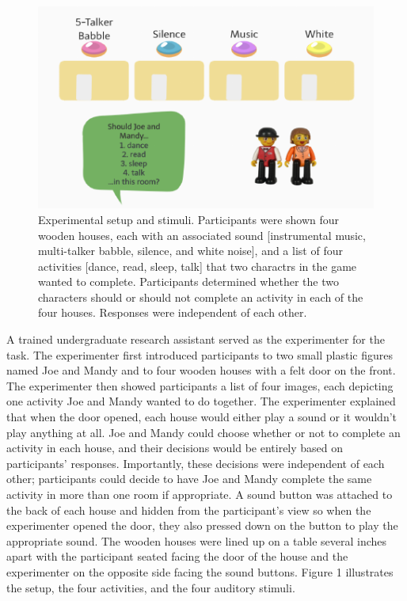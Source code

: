 \documentclass[10pt, letterpaper]{article}
\newenvironment{CodeChunk}{}{}
\begin{document}
\begin{CodeChunk}
\begin{figure}[t]

{\centering \includegraphics{figs/e3-stimuli-1} 

}

\caption[Experimental setup and stimuli]{Experimental setup and stimuli. Participants were shown four wooden houses, each with an associated sound [instrumental music, multi-talker babble, silence, and white noise], and a list of four activities [dance, read, sleep, talk] that two charactrs in the game wanted to complete. Participants determined whether the two characters should or should not complete an activity in each of the four houses. Responses were independent of each other.}\label{fig:e3-stimuli}
\end{figure}
\end{CodeChunk}

A trained undergraduate research assistant served as the experimenter
for the task. The experimenter first introduced participants to two
small plastic figures named Joe and Mandy and to four wooden houses with
a felt door on the front. The experimenter then showed participants a
list of four images, each depicting one activity Joe and Mandy wanted to
do together. The experimenter explained that when the door opened, each
house would either play a sound or it wouldn't play anything at all. Joe
and Mandy could choose whether or not to complete an activity in each
house, and their decisions would be entirely based on participants'
responses. Importantly, these decisions were independent of each other;
participants could decide to have Joe and Mandy complete the same
activity in more than one room if appropriate. A sound button was
attached to the back of each house and hidden from the participant's
view so when the experimenter opened the door, they also pressed down on
the button to play the appropriate sound. The wooden houses were lined
up on a table several inches apart with the participant seated facing
the door of the house and the experimenter on the opposite side facing
the sound buttons. Figure 1 illustrates the setup, the four activities,
and the four auditory stimuli.
\end{document}
